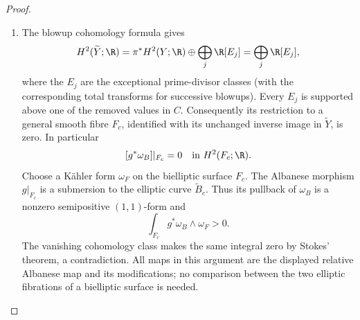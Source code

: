 \begin{proof}
\begin{enumerate}[label={$\langle1\rangle$\arabic*.},leftmargin=*]
\item The blowup cohomology formula gives
\[
 H^2(\widetilde Y;\R)
 =\pi^*H^2(Y;\R)\oplus\bigoplus_j\R[E_j]
 =\bigoplus_j\R[E_j],
\]
where the $E_j$ are the exceptional prime-divisor classes (with
the corresponding total transforms for successive blowups).
Every $E_j$ is supported above one of the removed values in $C$.
Consequently its restriction to a general smooth fibre $F_c$,
identified with its unchanged inverse image in $\widetilde Y$,
is zero. In particular
\[
 [g^*\omega_B]|_{F_c}=0\quad\hbox{in }H^2(F_c;\R).
\]
Choose a K\"ahler form $\omega_F$ on the bielliptic surface $F_c$.
The Albanese morphism $g|_{F_c}$ is a submersion to the elliptic
curve $\widetilde B_c$. Thus its pullback of $\omega_B$ is a
nonzero semipositive $(1,1)$-form and
\[
 \int_{F_c}g^*\omega_B\wedge\omega_F>0.
\]
The vanishing cohomology class makes the same integral zero by
Stokes' theorem, a contradiction. All maps in this argument are
the displayed relative Albanese map and its modifications; no
comparison between the two elliptic fibrations of a bielliptic
surface is needed.

\end{enumerate}
\end{proof}
